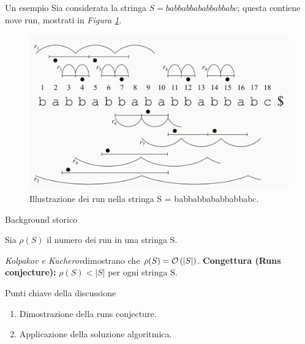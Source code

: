 \documentclass{beamer}
\begin{document}
    \begin{frame}{Un esempio}
        Sia considerata la stringa \(S = babbabbababbabbabc\); questa contiene nove 
        run, mostrati in \emph{Figura \ref{fig:1}}.

        \begin{figure}[!h]
            \centering
            \includegraphics[scale = .85]{../Extra/run example.jpg}
            \caption{Illustrazione dei run nella stringa S = babbabbababbabbabc.}
            \label{fig:1}
        \end{figure}
    \end{frame}

    \begin{frame}{Background storico}

        Sia \(\rho(S)\) il numero dei run in una stringa S.

        \emph{Kolpakov \emph{e} Kucherov}\footnotemark[1]
        dimostrano che \(\rho(S) = \mathcal{O} \left\lparen |S| \right\rparen\).
        \vskip 10pt
        \textbf{Congettura (Runs conjecture):} \(\rho (S) < |S|\) per ogni stringa S.

    \end{frame}

    \begin{frame}{Punti chiave della discussione}
        \begin{enumerate}
            \item Dimostrazione della runs conjecture.
            \item Applicazione della soluzione algoritmica.
        \end{enumerate}
    \end{frame}
\end{document}
